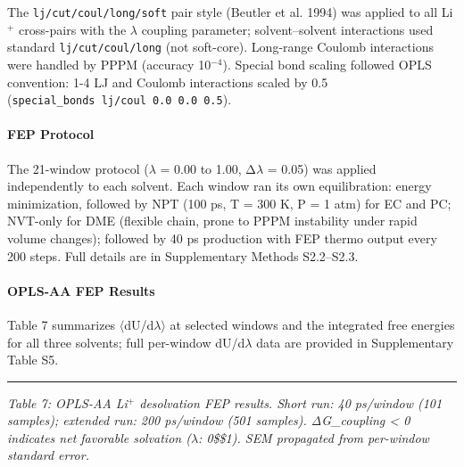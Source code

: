 \documentclass[
  11pt,
]{article}
\begin{document}
The \texttt{lj/cut/coul/long/soft} pair style (Beutler et al. 1994) was
applied to all Li\(^{+}\) cross-pairs with the \(\lambda\) coupling
parameter; solvent--solvent interactions used standard
\texttt{lj/cut/coul/long} (not soft-core). Long-range Coulomb
interactions were handled by PPPM (accuracy 10\(^{-4}\)). Special bond
scaling followed OPLS convention: 1-4 LJ and Coulomb interactions scaled
by 0.5 (\texttt{special\_bonds\ lj/coul\ 0.0\ 0.0\ 0.5}).

\paragraph{FEP Protocol}\label{fep-protocol-1}

The 21-window protocol (\(\lambda\) = 0.00 to 1.00, Δ\(\lambda\) = 0.05)
was applied independently to each solvent. Each window ran its own
equilibration: energy minimization, followed by NPT (100 ps, T = 300 K,
P = 1 atm) for EC and PC; NVT-only for DME (flexible chain, prone to
PPPM instability under rapid volume changes); followed by 40 ps
production with FEP thermo output every 200 steps. Full details are in
Supplementary Methods S2.2--S2.3.

\paragraph{OPLS-AA FEP Results}\label{opls-aa-fep-results}

Table 7 summarizes \(\langle\)dU/d\(\lambda\)\(\rangle\) at selected
windows and the integrated free energies for all three solvents; full
per-window dU/d\(\lambda\) data are provided in Supplementary Table S5.

\begin{center}\rule{0.5\linewidth}{0.5pt}\end{center}

\emph{Table 7: OPLS-AA Li\(^{+}\) desolvation FEP results. Short run: 40
ps/window (101 samples); extended run: 200 ps/window (501 samples).
ΔG\_coupling \textless{} 0 indicates net favorable solvation
(\(\lambda\): 0\$\rightarrow\$1). SEM propagated from per-window
standard error.}
\end{document}
